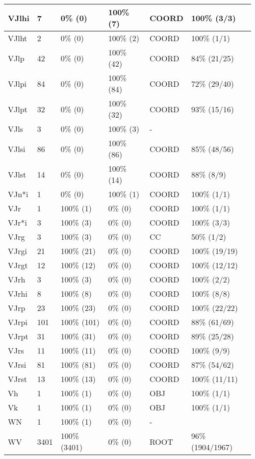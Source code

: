 \begin{figure*}
\begin{tabular}{|l|l|l|l||l|l|}
\hline
 VJlhi & 7 & 0\% (0) & 100\% (7) & COORD & 100\% (3/3) \\ 
\hline
 VJlht & 2 & 0\% (0) & 100\% (2) & COORD & 100\% (1/1) \\ 
\hline
 VJlp & 42 & 0\% (0) & 100\% (42) & COORD & 84\% (21/25) \\ 
\hline
 VJlpi & 84 & 0\% (0) & 100\% (84) & COORD & 72\% (29/40) \\ 
\hline
 VJlpt & 32 & 0\% (0) & 100\% (32) & COORD & 93\% (15/16) \\ 
\hline
 VJls & 3 & 0\% (0) & 100\% (3) & - &  \\ 
\hline
 VJlsi & 86 & 0\% (0) & 100\% (86) & COORD & 85\% (48/56) \\ 
\hline
 VJlst & 14 & 0\% (0) & 100\% (14) & COORD & 88\% (8/9) \\ 
\hline
 VJn*i & 1 & 0\% (0) & 100\% (1) & COORD & 100\% (1/1) \\ 
\hline
 VJr & 1 & 100\% (1) & 0\% (0) & COORD & 100\% (1/1) \\ 
\hline
 VJr*i & 3 & 100\% (3) & 0\% (0) & COORD & 100\% (3/3) \\ 
\hline
 VJrg & 3 & 100\% (3) & 0\% (0) & CC & 50\% (1/2) \\ 
\hline
 VJrgi & 21 & 100\% (21) & 0\% (0) & COORD & 100\% (19/19) \\ 
\hline
 VJrgt & 12 & 100\% (12) & 0\% (0) & COORD & 100\% (12/12) \\ 
\hline
 VJrh & 3 & 100\% (3) & 0\% (0) & COORD & 100\% (2/2) \\ 
\hline
 VJrhi & 8 & 100\% (8) & 0\% (0) & COORD & 100\% (8/8) \\ 
\hline
 VJrp & 23 & 100\% (23) & 0\% (0) & COORD & 100\% (22/22) \\ 
\hline
 VJrpi & 101 & 100\% (101) & 0\% (0) & COORD & 88\% (61/69) \\ 
\hline
 VJrpt & 31 & 100\% (31) & 0\% (0) & COORD & 89\% (25/28) \\ 
\hline
 VJrs & 11 & 100\% (11) & 0\% (0) & COORD & 100\% (9/9) \\ 
\hline
 VJrsi & 81 & 100\% (81) & 0\% (0) & COORD & 87\% (54/62) \\ 
\hline
 VJrst & 13 & 100\% (13) & 0\% (0) & COORD & 100\% (11/11) \\ 
\hline
 Vh & 1 & 100\% (1) & 0\% (0) & OBJ & 100\% (1/1) \\ 
\hline
 Vk & 1 & 100\% (1) & 0\% (0) & OBJ & 100\% (1/1) \\ 
\hline
 WN & 1 & 100\% (1) & 0\% (0) & - &  \\ 
\hline
 WV & 3401 & 100\% (3401) & 0\% (0) & ROOT & 96\% (1904/1967) \\ 
\hline
\end{tabular}
\end{figure*}
